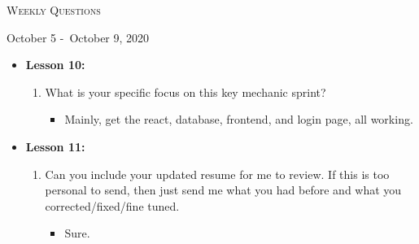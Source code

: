 \centerline{\LARGE\textsc{Weekly Questions}}
\centerline{October 5 -\ October 9, 2020}
\textbf{}
\begin{itemize}
  \item[] \textbf{\large Lesson 10:}
  \begin{enumerate}
    \item What is your specific focus on this key mechanic sprint?
    \begin{itemize}
      \item Mainly, get the react, database, frontend, and login page, all working.
    \end{itemize}
  \end{enumerate} 
\end{itemize}
\begin{itemize}
  \item[] \textbf{\large Lesson 11:}
  \begin{enumerate}
    \item Can you include your updated resume for me to review. If this is too personal to send, then just send me what you had before and what you corrected/fixed/fine tuned.
    \begin{itemize}
      \item Sure.
    \end{itemize}
  \end{enumerate} 
\end{itemize}
